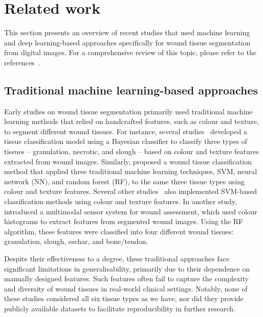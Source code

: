 \section{Related work}
\label{sec:background-study}
This section presents an overview of recent studies that used machine learning and deep learning-based approaches specifically for wound tissue segmentation from digital images. For a comprehensive review of this topic, please refer to the references~\citep{ZAHIA2020101742,anisuzzaman2022image,marijanovic2020systematic}.

\subsection{Traditional machine learning-based approaches}
Early studies on wound tissue segmentation primarily used traditional machine learning methods that relied on handcrafted features, such as colour and texture, to segment different wound tissues. For instance, several studies~\citep{RW19mukherjee2014automated,chakraborty2016telemedicine,veredas2009binary} developed a tissue classification model using a Bayesian classifier to classify three types of tissues -- granulation, necrotic, and slough -- based on colour and texture features extracted from wound images. Similarly, \citet{RW20veredas2015wound} proposed a wound tissue classification method that applied three traditional machine learning techniques, SVM, neural network (NN), and random forest (RF), to the same three tissue types using colour and texture features. Several other studies~\citep{RW21wannous2010enhanced, RW22wannous2007supervised, RW23wannous2010robust,li2022wound} also implemented SVM-based classification methods using colour and texture features. 
In another study, \citet{RW40chang2017multimodal} introduced a multimodal sensor system for wound assessment, which used colour histograms to extract features from segmented wound images. Using the RF algorithm, these features were classified into four different wound tissues: granulation, slough, eschar, and bone/tendon. 

Despite their effectiveness to a degree, these traditional approaches face significant limitations in generalisability, primarily due to their dependence on manually designed features. Such features often fail to capture the complexity and diversity of wound tissues in real-world clinical settings. Notably, none of these studies considered all six tissue types as we have, nor did they provide publicly available datasets to facilitate reproducibility in further research.

